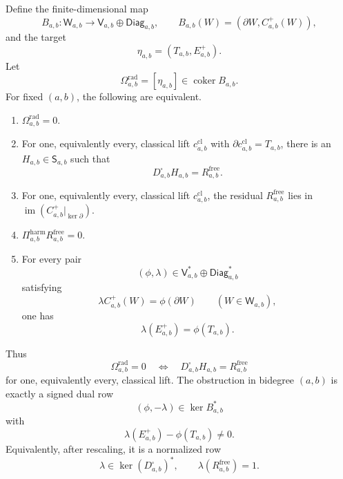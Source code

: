 \begin{prop}
\label{prop:app-radial-dual-potential-obstruction}
  Define the finite-dimensional map
  \[
    B_{a,b}\colon\mathsf W_{a,b}\longrightarrow
    \mathsf V_{a,b}\oplus\mathsf{Diag}_{a,b},
    \qquad
    B_{a,b}(W)=(\partial W,C^+_{a,b}(W)),
  \]
  and the target
  \[
    \eta_{a,b}=(T_{a,b},E^+_{a,b}).
  \]
  Let
  \[
    \Omega^{\mathrm{rad}}_{a,b}
    =
    [\eta_{a,b}]\in\operatorname{coker}B_{a,b}.
  \]
  For fixed \((a,b)\), the following are equivalent.
  \begin{enumerate}
    \item \(\Omega^{\mathrm{rad}}_{a,b}=0\).
    \item For one, equivalently every, classical lift
      \(c^{\mathrm{cl}}_{a,b}\) with
      \(\partial c^{\mathrm{cl}}_{a,b}=T_{a,b}\), there is an
      \(H_{a,b}\in\mathsf S_{a,b}\) such that
      \[
        D^\square_{a,b}H_{a,b}=R^{\mathrm{free}}_{a,b}.
      \]
    \item For one, equivalently every, classical lift
      \(c^{\mathrm{cl}}_{a,b}\), the residual
      \(R^{\mathrm{free}}_{a,b}\) lies in
      \(\operatorname{im}(C^+_{a,b}|_{\ker\partial})\).
    \item \(\Pi^{\mathrm{harm}}_{a,b}R^{\mathrm{free}}_{a,b}=0\).
    \item For every pair
      \[
        (\phi,\lambda)\in
        \mathsf V_{a,b}^*\oplus\mathsf{Diag}_{a,b}^*
      \]
      satisfying
      \[
        \lambda C^+_{a,b}(W)=\phi(\partial W)
        \qquad(W\in\mathsf W_{a,b}),
      \]
      one has
      \[
        \lambda(E^+_{a,b})=\phi(T_{a,b}).
      \]
  \end{enumerate}
  Thus
  \[
    \Omega^{\mathrm{rad}}_{a,b}=0
    \quad\Longleftrightarrow\quad
    D^\square_{a,b}H_{a,b}=R^{\mathrm{free}}_{a,b}
  \]
  for one, equivalently every, classical lift.  The obstruction in
  bidegree \((a,b)\) is exactly a signed dual row
  \[
    (\phi,-\lambda)\in\ker B_{a,b}^*
  \]
  with
  \[
    \lambda(E^+_{a,b})-\phi(T_{a,b})\ne0.
  \]
  Equivalently, after rescaling, it is a normalized row
  \[
    \lambda\in\ker(D^\square_{a,b})^*,
    \qquad
    \lambda(R^{\mathrm{free}}_{a,b})=1 .
  \]
\end{prop}

